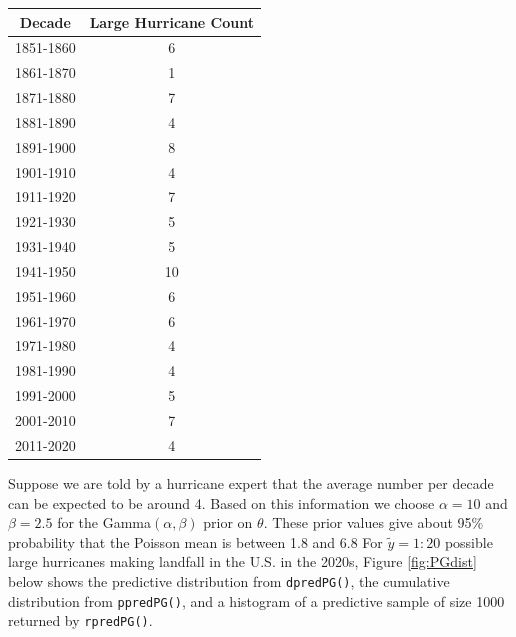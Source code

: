 \documentclass[12pt, a4paper]{article}
\begin{document}
\begin{center}
  \begin{tabular}{cc}
    Decade & Large Hurricane Count \\
    \hline
    1851-1860 & 6 \\
    1861-1870 & 1 \\
    1871-1880 & 7 \\
    1881-1890 & 4 \\
    1891-1900 & 8 \\
    1901-1910 & 4 \\
    1911-1920 & 7 \\
    1921-1930 & 5 \\
    1931-1940 & 5 \\
    1941-1950 & 10 \\
    1951-1960 & 6 \\
    1961-1970 & 6 \\
    1971-1980 & 4 \\
    1981-1990 & 4 \\
    1991-2000 & 5 \\
    2001-2010 & 7 \\
    2011-2020 & 4
  \end{tabular}
\end{center}

Suppose we are told by a hurricane expert that the average number per decade can be expected to be around 4.  Based on this information we choose $\alpha = 10$ and $\beta = 2.5$ for the Gamma$(\alpha,\beta)$ prior on $\theta$.  These prior values give about 95\% probability that the Poisson mean is between 1.8 and 6.8  For $\tilde{y} = 1:20$ possible large hurricanes making landfall in the U.S. in the 2020s, Figure \ref{fig:PGdist} below shows the predictive distribution from \texttt{dpredPG()}, the cumulative distribution from \texttt{ppredPG()}, and a histogram of a predictive sample of size 1000 returned by \texttt{rpredPG()}.
\end{document}
